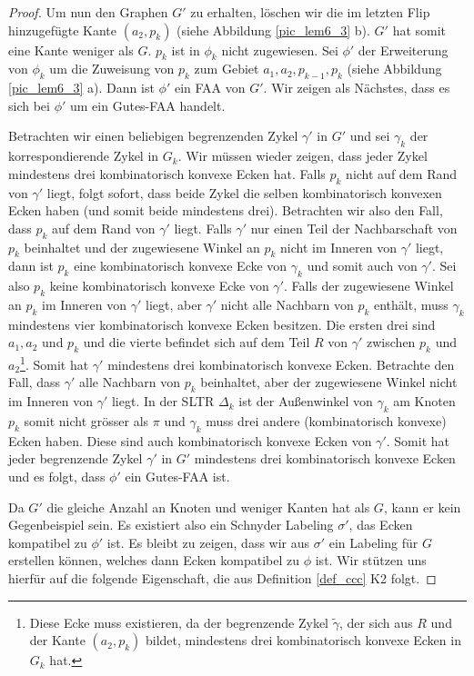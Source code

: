 \begin{proof}
Um nun den Graphen $G'$ zu erhalten, löschen wir die im letzten Flip hinzugefügte Kante $(a_2,p_{k})$ (siehe Abbildung \ref{pic_lem6_3} b). $G'$ hat somit eine Kante weniger als $G$. $p_k$ ist in $\phi_k$ nicht zugewiesen. Sei $\phi'$ der Erweiterung von $\phi_k$ um die Zuweisung von $p_k$ zum Gebiet $a_1,a_2,p_{k-1},p_k$ (siehe Abbildung \ref{pic_lem6_3} a). Dann ist $\phi'$ ein FAA von $G'$. Wir zeigen als Nächstes, dass es sich bei $\phi'$ um ein Gutes-FAA handelt.

Betrachten wir einen beliebigen begrenzenden Zykel $\gamma'$ in $G'$ und sei $\gamma_k$ der korrespondierende Zykel in $G_k$. Wir müssen wieder zeigen, dass jeder Zykel mindestens drei kombinatorisch konvexe Ecken hat. Falls $p_k$ nicht auf dem Rand von $\gamma'$ liegt, folgt sofort, dass beide Zykel die selben kombinatorisch konvexen Ecken haben (und somit beide mindestens drei). Betrachten wir also den Fall, dass $p_k$ auf dem Rand von $\gamma'$ liegt. Falls $\gamma'$ nur einen Teil der Nachbarschaft von $p_k$ beinhaltet und der zugewiesene Winkel an $p_k$ nicht im Inneren von $\gamma'$ liegt, dann ist $p_k$ eine kombinatorisch konvexe Ecke von $\gamma_k$ und somit auch von $\gamma'$. Sei also $p_k$ keine kombinatorisch konvexe Ecke von $\gamma'$. Falls der zugewiesene Winkel an $p_k$ im Inneren von $\gamma'$ liegt, aber $\gamma'$ nicht alle Nachbarn von $p_k$ enthält, muss $\gamma_k$ mindestens vier kombinatorisch konvexe Ecken besitzen. Die ersten drei sind $a_1,a_2$ und $p_k$ und die vierte befindet sich auf dem Teil $R$ von $\gamma'$ zwischen $p_k$ und $a_2$\footnote{Diese Ecke muss existieren, da der begrenzende Zykel $\tilde{\gamma}$, der sich aus $R$ und der Kante $(a_2,p_k)$ bildet, mindestens drei kombinatorisch konvexe Ecken in $G_k$ hat.}. Somit hat $\gamma'$ mindestens drei kombinatorisch konvexe Ecken. Betrachte den Fall, dass $\gamma'$ alle Nachbarn von $p_k$ beinhaltet, aber der zugewiesene Winkel nicht im Inneren von $\gamma'$ liegt. In der SLTR $\Delta_k$ ist der Außenwinkel von $\gamma_k$ am Knoten $p_k$ somit nicht grösser als $\pi$ und $\gamma_k$ muss drei andere (kombinatorisch konvexe) Ecken haben. Diese sind auch kombinatorisch konvexe Ecken von $\gamma'$. Somit hat jeder begrenzende Zykel $\gamma'$ in $G'$ mindestens drei kombinatorisch konvexe Ecken und es folgt, dass $\phi'$ ein Gutes-FAA ist.

Da $G'$ die gleiche Anzahl an Knoten und weniger Kanten hat als $G$, kann er kein Gegenbeispiel sein. Es existiert also ein Schnyder Labeling $\sigma'$, das Ecken kompatibel zu $\phi'$ ist. Es bleibt zu zeigen, dass wir aus $\sigma'$ ein Labeling für $G$ erstellen können, welches dann Ecken kompatibel zu $\phi$ ist. Wir stützen uns hierfür auf die folgende Eigenschaft, die aus Definition \ref{def_ccc} K2 folgt.


\end{proof}

